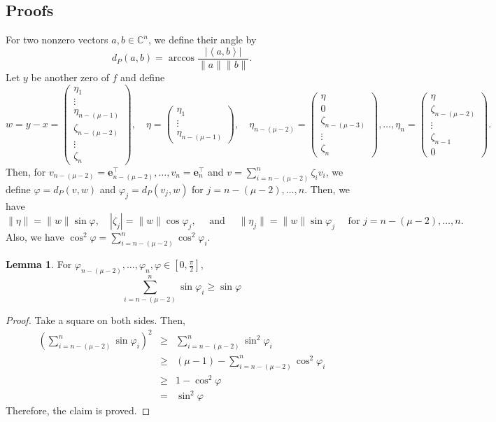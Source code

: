 \documentclass[12pt,oneside,reqno]{amsart}
\theoremstyle{definition}
\newtheorem{lem}[thm]{Lemma}
\begin{document}
\subsection{Proofs}

For two nonzero vectors $a,b\in \mathbb{C}^n$, we define their angle by
\[d_P(a,b)=\arccos\frac{|\left<a,b\right>|}{\|a\|\|b\|}.\]
Let $y$ be another zero of $f$ and define
\[w=y-x=\left(\begin{array}{c}
\eta_1\\
\vdots\\
\eta_{n-(\mu-1)}\\
\zeta_{n-(\mu-2)}\\
\vdots \\
\zeta_n
\end{array}\right),\quad \eta=\left(\begin{array}{c}
\eta_1\\
\vdots\\
\eta_{n-(\mu -1)}
\end{array}\right),\quad\eta_{n-(\mu-2)}=\left(\begin{array}{c}
\eta\\
0\\
\zeta_{n-(\mu -3)}\\
\vdots \\
\zeta_n
\end{array}\right),\dots, \eta_{n}=\left(\begin{array}{c}
\eta\\
\zeta_{n-(\mu -2)}\\
\vdots\\
\zeta_{n-1}\\
0
\end{array}\right).\]
Then, for $v_{n-(\mu-2)}=\mathbf{e}_{n-(\mu-2)}^\top,\dots, v_n=\mathbf{e}_n^\top$ and $v=\sum\limits_{i=n-(\mu-2)}^n\zeta_{i}v_{i}$, we define $\varphi=d_P(v,w)$ and $\varphi_j=d_P(v_j,w)$ for $j=n-(\mu-2),\dots, n$. Then, we have
\[\|\eta\|=\|w\|\sin\varphi,\quad |\zeta_j|=\|w\|\cos\varphi_j,\quad\text{ and }\quad\|\eta_j\|=\|w\|\sin\varphi_j \quad\text{ for }j=n-(\mu-2),\dots,n.\]
Also, we have $\cos^2\varphi = \sum\limits_{i=n-(\mu-2)}^n\cos ^2\varphi_{i}$.
\begin{lem}\label{lem:sinIneq}
	For $\varphi_{n-(\mu-2)},\dots,\varphi_n,\varphi \in [0,\frac{\pi}{2}]$,
	\[\sum\limits_{i=n-(\mu-2)}^n\sin\varphi_{i}\geq \sin \varphi\]
\end{lem}
\begin{proof}
	Take a square on both sides. Then,
	\begin{eqnarray*}
		\left(\sum\limits_{i=n-(\mu-2)}^n\sin\varphi_{i}\right)^2& \geq & \sum\limits_{i=n-(\mu-2)}^n\sin^2 \varphi_i\\
		&\geq & (\mu-1)-\sum\limits_{i=n-(\mu-2)}^n\cos^2\varphi_{i}\\
		& \geq & 1-\cos^2 \varphi\\
		& = & \sin^2 \varphi
	\end{eqnarray*}
	Therefore, the claim is proved.
\end{proof}
\end{document}
